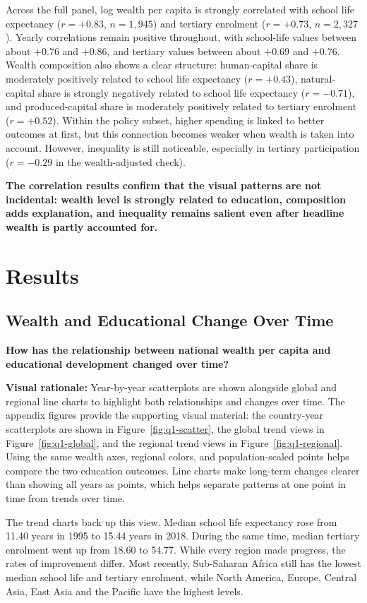 \documentclass{vgtc}
\begin{document}
Across the full panel, log wealth per capita is strongly correlated with school life expectancy ($r=+0.83$, $n=1{,}945$) and tertiary enrolment ($r=+0.73$, $n=2{,}327$). Yearly correlations remain positive throughout, with school-life values between about $+0.76$ and $+0.86$, and tertiary values between about $+0.69$ and $+0.76$. Wealth composition also shows a clear structure: human-capital share is moderately positively related to school life expectancy ($r=+0.43$), natural-capital share is strongly negatively related to school life expectancy ($r=-0.71$), and produced-capital share is moderately positively related to tertiary enrolment ($r=+0.52$). Within the policy subset, higher spending is linked to better outcomes at first, but this connection becomes weaker when wealth is taken into account. However, inequality is still noticeable, especially in tertiary participation ($r=-0.29$ in the wealth-adjusted check).

\textbf{The correlation results confirm that the visual patterns are not incidental: wealth level is strongly related to education, composition adds explanation, and inequality remains salient even after headline wealth is partly accounted for.}

\section{Results}
\subsection{Wealth and Educational Change Over Time}
\textbf{How has the relationship between national wealth per capita and educational development changed over time?}

\textbf{Visual rationale:} Year-by-year scatterplots are shown alongside global and regional line charts to highlight both relationships and changes over time. The appendix figures provide the supporting visual material: the country-year scatterplots are shown in Figure~\ref{fig:q1-scatter}, the global trend views in Figure~\ref{fig:q1-global}, and the regional trend views in Figure~\ref{fig:q1-regional}. Using the same wealth axes, regional colors, and population-scaled points helps compare the two education outcomes. Line charts make long-term changes clearer than showing all years as points, which helps separate patterns at one point in time from trends over time.

The trend charts back up this view. Median school life expectancy rose from 11.40 years in 1995 to 15.44 years in 2018. During the same time, median tertiary enrolment went up from 18.60 to 54.77. While every region made progress, the rates of improvement differ. Most recently, Sub-Saharan Africa still has the lowest median school life and tertiary enrolment, while North America, Europe, Central Asia, East Asia and the Pacific have the highest levels.
\end{document}
